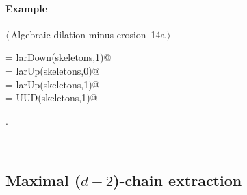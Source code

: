 \documentclass[11pt,oneside]{article}	%
\begin{document}
\paragraph{Example}

\begin{flushleft} \small
\begin{minipage}{\linewidth} \label{scrap22}
\protect{}$\langle\,$Algebraic dilation minus erosion\nobreak\ {\footnotesize 14a}$\,\rangle\equiv$
\vspace{-1ex}
\begin{list}{}{} \item
\mbox{} = larDown(skeletons,1)@\\
\mbox{} = larUp(skeletons,0)@\\
\mbox{} = larUp(skeletons,1)@\\
\mbox{} = UUD(skeletons,1)@\\
\mbox{}\verb@@{\NWsep}
\end{list}
\vspace{-1ex}
\footnotesize\addtolength{\baselineskip}{-1ex}
\begin{list}{}{\setlength{\itemsep}{-\parsep}\setlength{\itemindent}{-\leftmargin}}
\item {\NWtxtMacroNoRef}.
\end{list}
\end{minipage}\\[4ex]
\end{flushleft}



\subsection{Maximal ($d-2$)-chain extraction}
\end{document}
